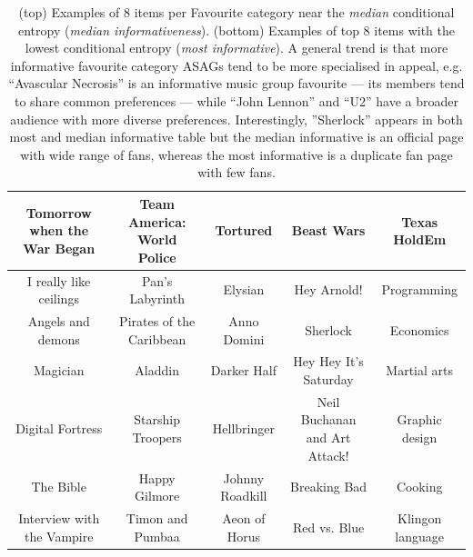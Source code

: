 \begin{table}[t!]
{\begin{tabular}{|c|c|c|c|c|}
\hline
Tomorrow when the War Began & Team America: World Police & Tortured & Beast Wars & Texas HoldEm \\
\hline
I really like ceilings  & Pan's Labyrinth & Elysian & Hey Arnold! & Programming\\
\hline
Angels and demons  & Pirates of the Caribbean & Anno Domini & Sherlock & Economics\\
\hline
Magician  & Aladdin & Darker Half & Hey Hey It's Saturday & Martial arts\\
\hline
Digital Fortress  & Starship Troopers & Hellbringer & Neil Buchanan and Art Attack! & Graphic design\\
\hline
The Bible  & Happy Gilmore & Johnny Roadkill & Breaking Bad & Cooking\\
\hline
Interview with the Vampire  & Timon and Pumbaa & Aeon of Horus & Red vs. Blue & Klingon language\\
\hline
\end{tabular}}

\caption{(top) Examples of 8 items per Favourite category near the \emph{median} conditional entropy (\emph{median informativeness}).
(bottom) Examples of top 8 items with the lowest conditional entropy
(\emph{most informative}).  A general trend is that more informative
favourite category ASAGs tend to be more specialised in appeal,
e.g. ``Avascular Necrosis'' is an informative music group favourite
--- its members tend to share common preferences --- while ``John
Lennon'' and ``U2'' have a broader audience with more diverse
preferences.
Interestingly, ''Sherlock'' appears in both most and median
informative table but the median informative is an official page with
wide range of fans, whereas the most informative is a duplicate fan
page with few fans.}
\label{table:fav_examples}
\end{table}

